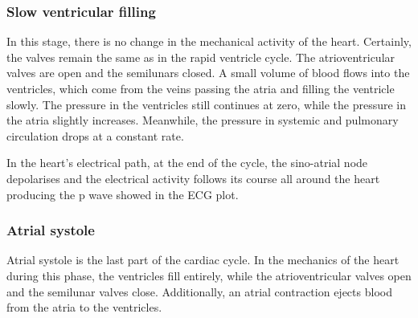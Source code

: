 \subsubsection{Slow ventricular filling}
In this stage, there is no change in the mechanical activity of the heart. Certainly, the valves remain the same as in the rapid ventricle cycle. The atrioventricular valves are open and the semilunars closed. A small volume of blood flows into the ventricles, which come from the veins passing the atria and filling the ventricle slowly. The pressure in the ventricles still continues at zero, while the pressure in the atria slightly increases. Meanwhile, the pressure in systemic and pulmonary circulation drops at a constant rate. 

In the heart's electrical path, at the end of the cycle, the sino-atrial node depolarises and the electrical activity follows its course all around the heart producing the p wave showed in the ECG plot.  

 
\subsubsection{Atrial systole}
Atrial systole is the last part of the cardiac cycle. In the mechanics of the heart during this phase, the ventricles fill entirely, while the atrioventricular valves open and the semilunar valves close. Additionally, an atrial contraction ejects blood from the atria to the ventricles. 

